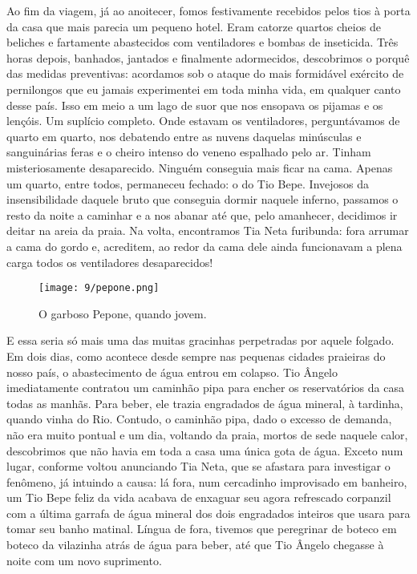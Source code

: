 Ao fim da viagem, já ao anoitecer, fomos festivamente recebidos pelos tios à porta da casa que mais parecia um pequeno hotel.
Eram catorze quartos cheios de beliches e fartamente abastecidos com ventiladores e bombas de inseticida.
Três horas depois, banhados, jantados e finalmente adormecidos, descobrimos o porquê das medidas preventivas: acordamos sob o ataque do mais formidável exército de pernilongos que eu jamais experimentei em toda minha vida, em qualquer canto desse país.
 Isso em meio a um lago de suor que nos ensopava os pijamas e os lençóis.
Um suplício completo.
Onde estavam os ventiladores, perguntávamos de quarto em quarto, nos debatendo entre as nuvens daquelas minúsculas e sanguinárias feras e o cheiro intenso do veneno espalhado pelo ar.
Tinham misteriosamente desaparecido.
Ninguém conseguia mais ficar na cama.
Apenas um quarto, entre todos, permaneceu fechado: o do Tio Bepe.
Invejosos da insensibilidade daquele bruto que conseguia dormir naquele inferno, passamos o resto da noite a caminhar e a nos abanar até que, pelo amanhecer, decidimos ir deitar na areia da praia.
Na volta, encontramos Tia Neta furibunda: fora arrumar a cama do gordo e, acreditem, ao redor da cama dele ainda funcionavam a plena carga todos os ventiladores desaparecidos! 

\begin{figure}[H]
\centering
\texttt{[image: 9/pepone.png]}
\caption{O garboso Pepone, quando jovem.}
\end{figure}

E essa seria só mais uma das muitas gracinhas perpetradas por aquele folgado.
Em dois dias, como acontece desde sempre nas pequenas cidades praieiras do nosso país, o abastecimento de água entrou em colapso.
Tio Ângelo imediatamente contratou um caminhão pipa para encher os reservatórios da casa todas as manhãs.
Para beber, ele trazia engradados de água mineral, à tardinha, quando vinha do Rio.
Contudo, o caminhão pipa, dado o excesso de demanda, não era muito pontual e um dia, voltando da praia, mortos de sede naquele calor, descobrimos que não havia em toda a casa uma única gota de água.
Exceto num lugar, conforme voltou anunciando Tia Neta, que se afastara para investigar o fenômeno, já intuindo a causa: lá fora, num cercadinho improvisado em banheiro, um Tio Bepe feliz da vida acabava de enxaguar seu agora refrescado corpanzil com a última garrafa de água mineral dos dois engradados inteiros que usara para tomar seu banho matinal.
Língua de fora, tivemos que peregrinar de boteco em boteco da vilazinha atrás de água para beber, até que Tio Ângelo chegasse à noite com um novo suprimento.

